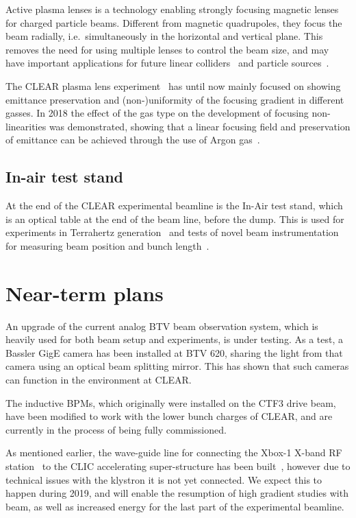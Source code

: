 \documentclass[a4paper,
               keeplastbox,   %
               ]{jacow}
\begin{document}
Active plasma lenses is a technology enabling strongly focusing magnetic lenses for charged particle beams.
Different from magnetic quadrupoles, they focus the beam radially, i.e.\ simultaneously in the horizontal and vertical plane.
This removes the need for using multiple lenses to control the beam size, and may have important applications for future linear colliders~\cite{CarlApochromatic,SteinkeCoupling} and particle sources~\cite{Braun1}.

The CLEAR plasma lens experiment~\cite{CLEAR-PLE,Erik::CLEARrev} has until now mainly focused on showing emittance preservation and (non-)uniformity of the focusing gradient in different gasses.
In 2018 the effect of the gas type on the development of focusing non-linearities was demonstrated, showing that a linear focusing field and preservation of emittance can be achieved through the use of Argon gas~\cite{CarlPRL}.

\subsection{In-air test stand}

At the end of the CLEAR experimental beamline is the In-Air test stand, which is an optical table at the end of the beam line, before the dump.
This is used for experiments in Terrahertz generation~\cite{CurcioPRAB} and tests of novel beam instrumentation for measuring beam position and bunch length~\cite{Thibaut::CLEARrev}.

\section{Near-term plans}

An upgrade of the current analog BTV beam observation system, which is heavily used for both beam setup and experiments, is under testing.
As a test, a Bassler GigE camera has been installed at BTV 620, sharing the light from that camera using an optical beam splitting mirror.
This has shown that such cameras can function in the environment at CLEAR.

The inductive BPMs, which originally were installed on the CTF3 drive beam, have been modified to work with the lower bunch charges of CLEAR, and are currently in the process of being fully commissioned.

As mentioned earlier, the wave-guide line for connecting the Xbox-1 X-band RF station~\cite{Xbox1,Xboxen} to the CLIC accelerating super-structure has been built~\cite{Pitman:IPAC19-WEPRB063}, however due to technical issues with the klystron it is not yet connected.
We expect this to happen during 2019, and will enable the resumption of high gradient studies with beam, as well as increased energy for the last part of the experimental beamline.
\end{document}
